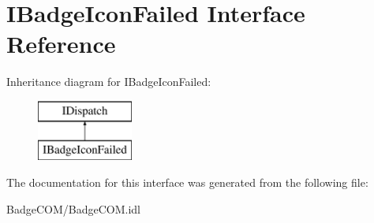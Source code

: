 \hypertarget{interface_i_badge_icon_failed}{\section{I\-Badge\-Icon\-Failed Interface Reference}
\label{interface_i_badge_icon_failed}
}
Inheritance diagram for I\-Badge\-Icon\-Failed\-:\begin{figure}[H]
\begin{center}
\leavevmode
\includegraphics[height=2.000000cm]{interface_i_badge_icon_failed}
\end{center}
\end{figure}


The documentation for this interface was generated from the following file\-:\begin{DoxyCompactItemize}
\item 
Badge\-C\-O\-M/Badge\-C\-O\-M.\-idl\end{DoxyCompactItemize}
